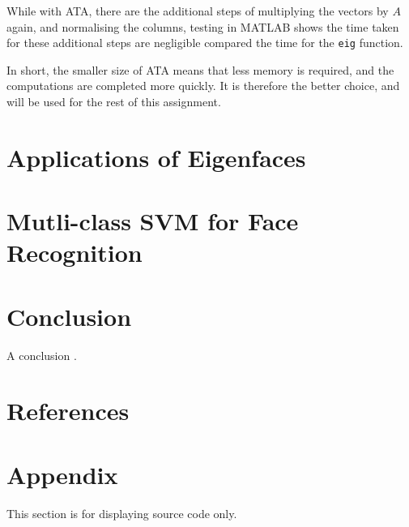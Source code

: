 \documentclass[a4paper, 10pt, conference]{ieeeconf}
\begin{document}
While with ATA, there are the additional steps of multiplying the vectors by $A$ again, and normalising the columns, testing in MATLAB shows the time taken for these additional steps are negligible compared the time for the \texttt{eig} function.

In short, the smaller size of ATA means that less memory is required, and the computations are completed more quickly. It is therefore the better choice, and will be used for the rest of this assignment.

\section{Applications of Eigenfaces}


\section{Mutli-class SVM for Face Recognition}

\section{Conclusion}

A conclusion \cite{infrared}.


\section{References}



\section{Appendix}

This section is for displaying source code only.\\
% 
\end{document}
